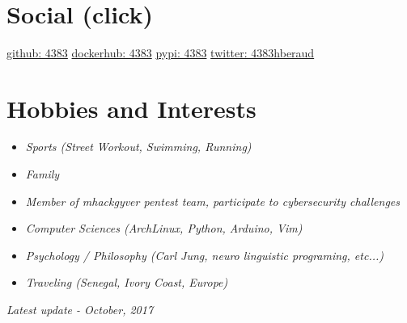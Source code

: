 \documentclass[]{friggeri-cv}
\begin{document}
\begin{aside}
~
~
~
    \section{Social (click)}
        \href{https://github.com/4383}{github: 4383}
        \href{https://hub.docker.com/r/4383}{dockerhub: 4383}
        \href{https://warehouse.python.org/user/4383/}{pypi: 4383}
        \href{https://twitter.com/4383hberaud}{twitter: 4383hberaud}
        ~
\end{aside}

\section{Hobbies and Interests}
    \begin {itemize}
        \item \emph {Sports (Street Workout, Swimming, Running)}
        \item \emph {Family}
        \item \emph {Member of mhackgyver pentest team, participate to cybersecurity challenges}
        \item \emph {Computer Sciences (ArchLinux, Python, Arduino, Vim)}
        \item \emph {Psychology / Philosophy (Carl Jung, neuro linguistic programing, etc...)}
        \item \emph {Traveling (Senegal, Ivory Coast, Europe)}
\end {itemize}

\begin{flushright}
    \emph{Latest update - October, 2017}
\end{flushright}
\end{document}
